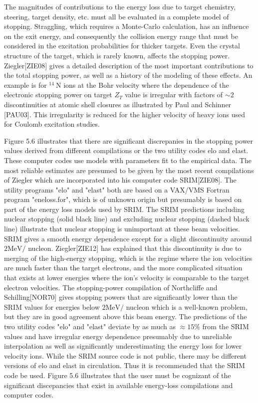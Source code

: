 \documentclass[10pt]{article}
\begin{document}
The magnitudes of contributions to the energy loss due to target chemistry, steering, target density, etc. must all be evaluated in a complete model of stopping. Straggling, which requires a Monte-Carlo calculation, has an influence on the exit energy, and consequently the collision energy range that must be considered in the excitation probabilities for thicker targets. Even the crystal structure of the target, which is rarely known, affects the stopping power. Ziegler[ZIE08] gives a detailed description of the most important contributions to the total stopping power, as well as a history of the modeling of these effects. An example is for ${ }^{14} \mathrm{~N}$ ions at the Bohr velocity where the dependence of the electronic stopping power on target $Z_{T}$ value is irregular with factors of $\sim 2$ discontinuities at atomic shell closures as illustrated by Paul and Schinner [PAU03]. This irregularity is reduced for the higher velocity of heavy ions used for Coulomb excitation studies.

Figure 5.6 illustrates that there are significant discrepanies in the stopping power values derived from different compilations or the two utility codes elo and elast. These computer codes use models with parameters fit to the empirical data. The most reliable estimates are presumed to be given by the most recent compilations of Ziegler which are incorporated into his computer code SRIM[ZIE08]. The utility programs "elo" and "elast" both are based on a VAX/VMS Fortran program "eneloss.for", which is of unknown origin but presumably is based on part of the energy loss models used by SRIM. The SRIM predictions including nuclear stopping (solid black line) and excluding nuclear stopping (dashed black line) illustrate that nuclear stopping is unimportant at these beam velocities. SRIM gives a smooth energy dependence except for a slight discontinuity around $2 \mathrm{MeV} /$ nucleon. Ziegler[ZIE12] has explained that this discontinuity is due to merging of the high-energy stopping, which is the regime where the ion velocities are much faster than the target electrons, and the more complicated situation that exists at lower energies where the ion's velocity is comparable to the target electron velocities. The stopping-power compilation of Northcliffe and Schilling[NOR70] gives stopping powers that are significantly lower than the SRIM values for energies below $2 \mathrm{MeV} /$ nucleon which is a well-known problem, but they are in good agreement above this beam energy. The predictions of the two utility codes "elo" and "elast" deviate by as much as $\approx 15 \%$ from the SRIM values and have irregular energy dependence presumably due to unreliable interpolation as well as significantly underestimating the energy loss for lower velocity ions. While the SRIM source code is not public, there may be different versions of elo and elast in circulation. Thus it is recommended that the SRIM code be used. Figure 5.6 illustrates that the user must be cognizant of the significant discepancies that exist in available energy-loss compilations and computer codes.
\end{document}
